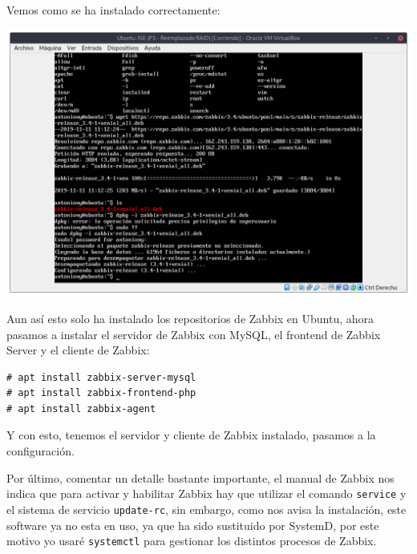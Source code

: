 \documentclass[12pt, spanish]{article}
\begin{document}
\newpage

Vemos como se ha instalado correctamente:
\begin{center}
\includegraphics[scale=0.45]{instalacion_zabbix.png}
\end{center}

Aun así esto solo ha instalado los repositorios de Zabbix en Ubuntu, ahora pasamos a instalar el servidor de Zabbix con MySQL, el frontend de Zabbix Server y el cliente de Zabbix:

\vspace{2cm}

\begin{verbatim}
# apt install zabbix-server-mysql
# apt install zabbix-frontend-php
# apt install zabbix-agent
\end{verbatim}

\vspace{2cm}

Y con esto, tenemos el servidor y cliente de Zabbix instalado, pasamos a la configuración.

\newpage

Por último, comentar un detalle bastante importante, el manual de Zabbix nos indica que para activar y habilitar Zabbix hay que utilizar el comando \texttt{service} y el sistema de servicio \texttt{update-rc}, sin embargo, como nos avisa la instalación, este software ya no esta en uso, ya que ha sido sustituido por SystemD, por este motivo yo usaré \texttt{systemctl} para gestionar los distintos procesos de Zabbix.
\end{document}
